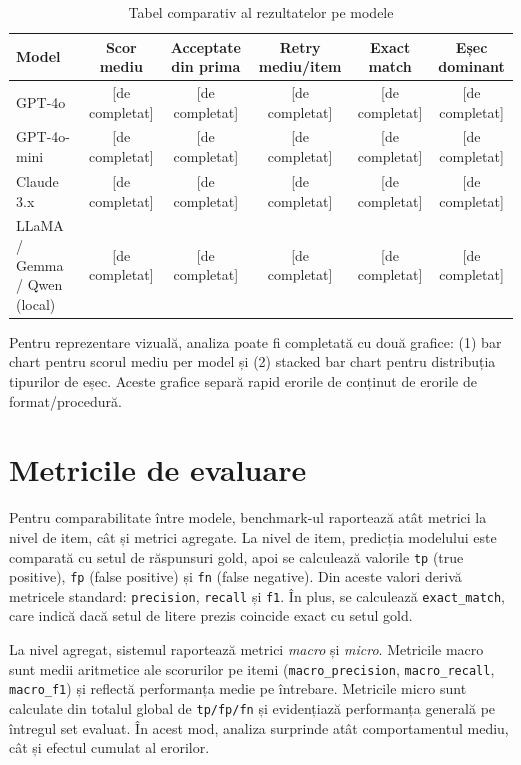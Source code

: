 \documentclass[12pt, a4paper, oneside, romanian]{teza-upb}
\begin{document}
\begin{table}[H]
\centering
\caption{Tabel comparativ al rezultatelor pe modele}
\label{tab:benchmark-comparativ}
\begin{tabular}{|l|c|c|c|c|c|}
\hline
\textbf{Model} & \textbf{Scor mediu} & \textbf{Acceptate din prima} & \textbf{Retry mediu/item} & \textbf{Exact match} & \textbf{Eșec dominant} \\
\hline
GPT-4o & [de completat] & [de completat] & [de completat] & [de completat] & [de completat] \\
\hline
GPT-4o-mini & [de completat] & [de completat] & [de completat] & [de completat] & [de completat] \\
\hline
Claude 3.x & [de completat] & [de completat] & [de completat] & [de completat] & [de completat] \\
\hline
LLaMA / Gemma / Qwen (local) & [de completat] & [de completat] & [de completat] & [de completat] & [de completat] \\
\hline
\end{tabular}
\end{table}

Pentru reprezentare vizuală, analiza poate fi completată cu două grafice: (1) bar chart pentru scorul mediu per model și (2) stacked bar chart pentru distribuția tipurilor de eșec. Aceste grafice separă rapid erorile de conținut de erorile de format/procedură.

\section{Metricile de evaluare}

Pentru comparabilitate între modele, benchmark-ul raportează atât metrici la nivel de item, cât și metrici agregate. La nivel de item, predicția modelului este comparată cu setul de răspunsuri gold, apoi se calculează valorile \texttt{tp} (true positive), \texttt{fp} (false positive) și \texttt{fn} (false negative). Din aceste valori derivă metricele standard: \texttt{precision}, \texttt{recall} și \texttt{f1}. În plus, se calculează \texttt{exact\_match}, care indică dacă setul de litere prezis coincide exact cu setul gold.

La nivel agregat, sistemul raportează metrici \textit{macro} și \textit{micro}. Metricile macro sunt medii aritmetice ale scorurilor pe itemi (\texttt{macro\_precision}, \texttt{macro\_recall}, \texttt{macro\_f1}) și reflectă performanța medie pe întrebare. Metricile micro sunt calculate din totalul global de \texttt{tp/fp/fn} și evidențiază performanța generală pe întregul set evaluat. În acest mod, analiza surprinde atât comportamentul mediu, cât și efectul cumulat al erorilor.
\end{document}

